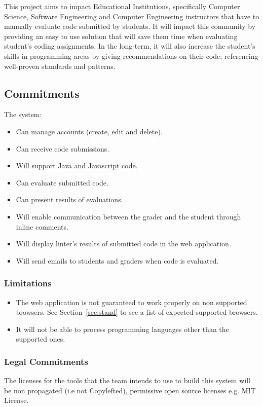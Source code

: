
This project aims to impact Educational Institutions, specifically Computer
Science, Software Engineering and Computer Engineering instructors that have to
manually evaluate code submitted by students. It will impact this community by
providing an easy to use solution that will save them time when evaluating
student's coding assignments. In the long-term, it will also increase the
student's skills in programming areas by giving recommendations on their code;
referencing well-proven standards and patterns.

\subsection{Commitments}
The system:
\begin{itemize}
\item Can manage accounts (create, edit and delete).
\item Can receive code submissions.
\item Will support Java and Javascript code.
\item Can evaluate submitted code.
\item Can present results of evaluations.
\item Will enable communication between the grader and the student through
inline comments.
\item Will display linter's results of submitted code in the web application.
\item Will send emails to students and graders when code is evaluated.
\end{itemize}

\subsubsection{Limitations}
\begin{itemize}
\item The web application is not guaranteed to work properly on non supported
browsers. See Section~\ref{sec:stand} to see a list of expected supported browsers.
\item It will not be able to process programming languages other than the
supported ones.
\end{itemize}

\subsubsection{Legal Commitments}

The licenses for the tools that the team intends to use to build this system
will be non propagated (i.e not Copylefted), permissive open source licenses
e.g. MIT License.
